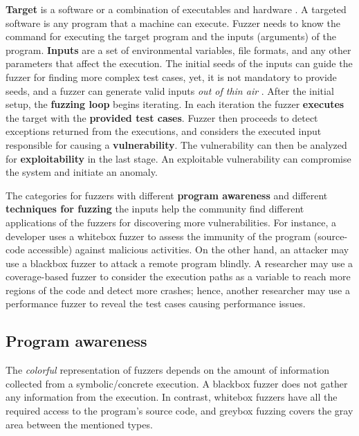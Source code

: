 \textbf{Target} is a software or a combination of executables and hardware \cite{song2019periscope}. A targeted software is any program that a machine can execute. 
Fuzzer needs to know the command for executing the target program and the inputs (arguments) of the program. \textbf{Inputs} are a set of environmental variables, file formats, and any other parameters that affect the execution. The initial seeds of the inputs can guide the fuzzer for finding more complex test cases, yet, it is not mandatory to provide seeds, and a fuzzer can generate valid inputs \textit{out of thin air} \cite{out_of_thin_air}. After the initial setup, the \textbf{fuzzing loop} begins iterating. In each iteration the fuzzer \textbf{executes} the target with the \textbf{provided test cases}. Fuzzer then proceeds to detect exceptions returned from the executions, and considers the executed input responsible for causing a \textbf{vulnerability}. The vulnerability can then be analyzed for \textbf{exploitability} in the last stage. An exploitable vulnerability can compromise the system and initiate an anomaly.

The categories for fuzzers with different \textbf{program awareness} and different \textbf{techniques for fuzzing} the inputs help the community find different applications of the fuzzers for discovering more vulnerabilities. For instance, a developer uses a whitebox fuzzer to assess the immunity of the program (source-code accessible) against malicious activities. On the other hand, an attacker may use a blackbox fuzzer to attack a remote program blindly. A researcher may use a coverage-based fuzzer to consider the execution paths as a variable to reach more regions of the code and detect more crashes; hence, another researcher may use a performance fuzzer to reveal the test cases causing performance issues. 

\subsection{Program awareness}


The \textit{colorful} representation of fuzzers depends on the amount of information collected from a symbolic/concrete execution. A blackbox fuzzer does not gather any information from the execution. In contrast, whitebox fuzzers have all the required access to the program's source code, and greybox fuzzing covers the gray area between the mentioned types.

